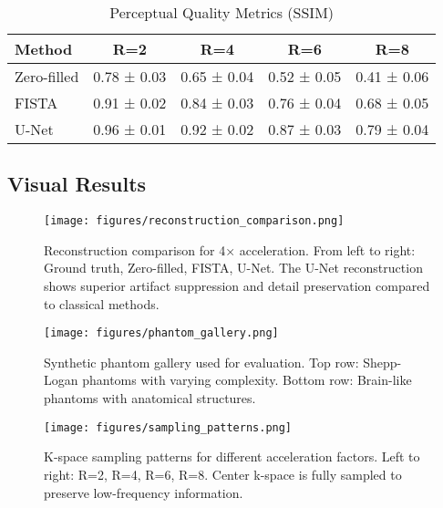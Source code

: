 \documentclass[11pt,a4paper]{article}
\begin{document}
\begin{table}[H]
\centering
\caption{Perceptual Quality Metrics (SSIM)}
\label{tab:results_ssim}
\begin{tabular}{@{}lcccc@{}}
\toprule
\textbf{Method} & \textbf{R=2} & \textbf{R=4} & \textbf{R=6} & \textbf{R=8} \\
\midrule
Zero-filled & 0.78 ± 0.03 & 0.65 ± 0.04 & 0.52 ± 0.05 & 0.41 ± 0.06 \\
FISTA & 0.91 ± 0.02 & 0.84 ± 0.03 & 0.76 ± 0.04 & 0.68 ± 0.05 \\
U-Net & 0.96 ± 0.01 & 0.92 ± 0.02 & 0.87 ± 0.03 & 0.79 ± 0.04 \\
\bottomrule
\end{tabular}
\end{table}

\subsection{Visual Results}

\begin{figure}[H]
    \centering
      \texttt{[image: figures/reconstruction\_comparison.png]}
    \caption{Reconstruction comparison for 4× acceleration. From left to right: Ground truth, Zero-filled, FISTA, U-Net. The U-Net reconstruction shows superior artifact suppression and detail preservation compared to classical methods.}
    \label{fig:reconstruction_comparison}
\end{figure}

\begin{figure}[H]
    \centering
     \texttt{[image: figures/phantom\_gallery.png]}
        \caption{Synthetic phantom gallery used for evaluation. Top row: Shepp-Logan phantoms with varying complexity. Bottom row: Brain-like phantoms with anatomical structures.}
    \label{fig:phantom_gallery}
\end{figure}

\begin{figure}[H]
    \centering
     \texttt{[image: figures/sampling\_patterns.png]}
    \caption{K-space sampling patterns for different acceleration factors. Left to right: R=2, R=4, R=6, R=8. Center k-space is fully sampled to preserve low-frequency information.}
    \label{fig:sampling_patterns}
\end{figure}
\end{document}

